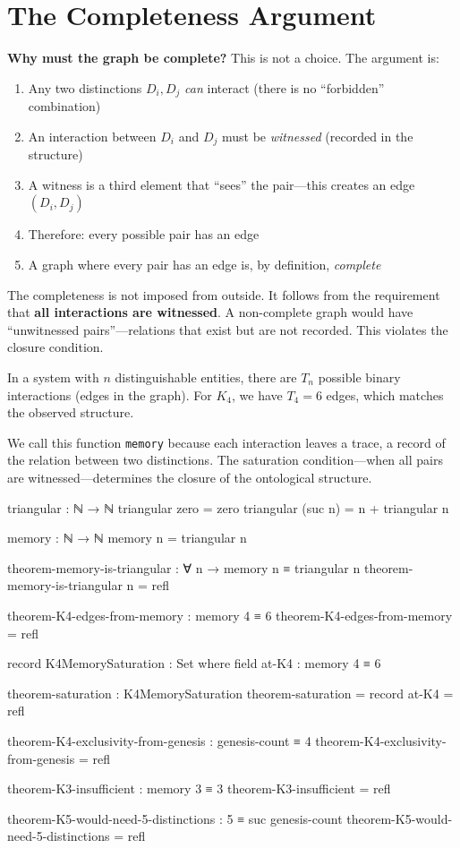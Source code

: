 \documentclass[11pt,a4paper]{book}
\begin{document}
\section{The Completeness Argument}

\textbf{Why must the graph be complete?} This is not a choice. The argument is:
\begin{enumerate}
\item Any two distinctions $D_i, D_j$ \emph{can} interact (there is no ``forbidden'' combination)
\item An interaction between $D_i$ and $D_j$ must be \emph{witnessed} (recorded in the structure)
\item A witness is a third element that ``sees'' the pair---this creates an edge $(D_i, D_j)$
\item Therefore: every possible pair has an edge
\item A graph where every pair has an edge is, by definition, \emph{complete}
\end{enumerate}

The completeness is not imposed from outside. It follows from the requirement that 
\textbf{all interactions are witnessed}. A non-complete graph would have ``unwitnessed pairs''---relations 
that exist but are not recorded. This violates the closure condition.

In a system with $n$ distinguishable entities, there are $T_n$ possible binary interactions (edges in the graph).
For $K_4$, we have $T_4 = 6$ edges, which matches the observed structure.

We call this function \texttt{memory} because each interaction leaves a trace, a record of the relation between two distinctions.
The saturation condition---when all pairs are witnessed---determines the closure of the ontological structure.

\begin{code}
triangular : ℕ → ℕ
triangular zero = zero
triangular (suc n) = n + triangular n

memory : ℕ → ℕ
memory n = triangular n

theorem-memory-is-triangular : ∀ n → memory n ≡ triangular n
theorem-memory-is-triangular n = refl

theorem-K4-edges-from-memory : memory 4 ≡ 6
theorem-K4-edges-from-memory = refl

record K4MemorySaturation : Set where
  field
    at-K4 : memory 4 ≡ 6

theorem-saturation : K4MemorySaturation
theorem-saturation = record { at-K4 = refl }

theorem-K4-exclusivity-from-genesis : genesis-count ≡ 4
theorem-K4-exclusivity-from-genesis = refl

theorem-K3-insufficient : memory 3 ≡ 3
theorem-K3-insufficient = refl

theorem-K5-would-need-5-distinctions : 5 ≡ suc genesis-count
theorem-K5-would-need-5-distinctions = refl
\end{code}
\end{document}
